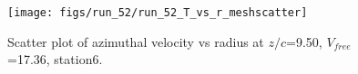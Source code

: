 \begin{figure}[H]
\centering
\texttt{[image: figs/run\_52/run\_52\_T\_vs\_r\_meshscatter]}
\caption{Scatter plot of azimuthal velocity vs radius at $z/c$=9.50, $V_{free}$=17.36, station6.}
\end{figure}


